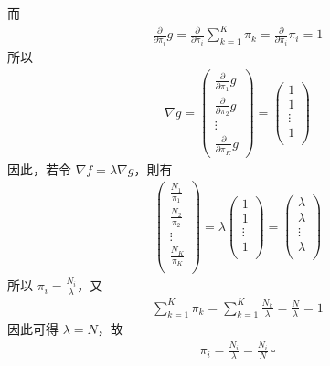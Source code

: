 \documentclass{article}
\begin{document}
而
\begin{align*}
    \frac{\partial}{\partial \pi_i} g = \frac{\partial}{\partial \pi_i} \sum_{k = 1}^K \pi_k = \frac{\partial}{\partial \pi_i} \pi_i = 1
\end{align*}
所以
\begin{align*}
    \nabla g = 
    \left(
    \begin{array}{c}
        \frac{\partial}{\partial \pi_1} g\\
        \frac{\partial}{\partial \pi_2} g\\
        \vdots\\
        \frac{\partial}{\partial \pi_K} g
    \end{array}
    \right)
    =
    \left(
    \begin{array}{c}
        1\\
        1\\
        \vdots\\
        1\\
    \end{array}
    \right)
\end{align*}
因此，若令 $\nabla f = \lambda \nabla g$，則有
\begin{align*}
    \left(
    \begin{array}{c}
        \frac{N_1}{\pi_1}\\
        \frac{N_2}{\pi_2}\\
        \vdots\\
        \frac{N_K}{\pi_K}\\
    \end{array}
    \right)
    = \lambda
    \left(
    \begin{array}{c}
        1\\
        1\\
        \vdots\\
        1\\
    \end{array}
    \right)
    =
    \left(
    \begin{array}{c}
        \lambda\\
        \lambda\\
        \vdots\\
        \lambda\\
    \end{array}
    \right)
\end{align*}
所以 $\pi_i = \frac{N_i}{\lambda}$，又
\begin{align*}
    \sum_{k = 1}^K \pi_k = \sum_{k = 1}^K \frac{N_k}{\lambda} = \frac{N}{\lambda} = 1
\end{align*}
因此可得 $\lambda = N$，故
\begin{align*}
    \pi_i = \frac{N_i}{\lambda} = \frac{N_i}{N}\ \square
\end{align*}
\end{document}
